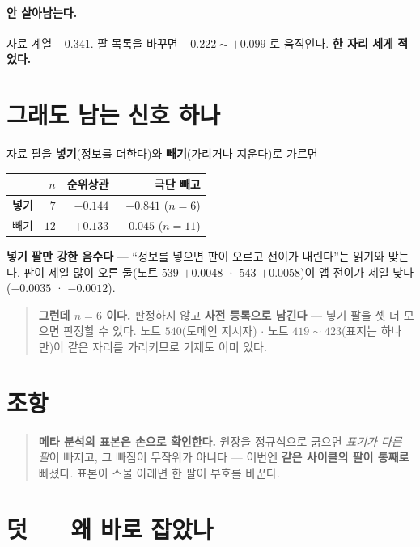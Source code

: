\documentclass[11pt]{article}
\begin{document}
\paragraph{안 살아남는다.}
자료 계열 $-0.341$. 팔 목록을 바꾸면 $-0.222 \sim +0.099$ 로 움직인다.
\textbf{한 자리 세게 적었다.}

\section{그래도 남는 신호 하나}

자료 팔을 \textbf{넣기}(정보를 더한다)와 \textbf{빼기}(가리거나 지운다)로
가르면

\begin{center}
\begin{tabular}{lrrr}
\hline
 & $n$ & 순위상관 & 극단 빼고 \\
\hline
\textbf{넣기} & $7$ & $-0.144$ & $\mathbf{-0.841}$ ($n=6$) \\
빼기 & $12$ & $+0.133$ & $-0.045$ ($n=11$) \\
\hline
\end{tabular}
\end{center}

\textbf{넣기 팔만 강한 음수다} --- ``정보를 넣으면 판이 오르고 전이가
내린다''는 읽기와 맞는다. 판이 제일 많이 오른 둘(노트 $539$ $+0.0048$ ·
$543$ $+0.0058$)이 앱 전이가 제일 낮다($-0.0035$ · $-0.0012$).

\begin{quote}
\textbf{그런데 $n=6$ 이다.} 판정하지 않고 \textbf{사전 등록으로 남긴다} ---
넣기 팔을 셋 더 모으면 판정할 수 있다. 노트 $540$(도메인 지시자) $\cdot$
노트 $419\!\sim\!423$(표지는 하나만)이 같은 자리를 가리키므로 기제도 이미
있다.
\end{quote}

\section*{조항}

\begin{quote}
\textbf{메타 분석의 표본은 손으로 확인한다.} 원장을 정규식으로 긁으면
\emph{표기가 다른 팔}이 빠지고, 그 빠짐이 무작위가 아니다 --- 이번엔
\textbf{같은 사이클의 팔이 통째로} 빠졌다. 표본이 스물 아래면 한 팔이
부호를 바꾼다.
\end{quote}

\section*{덧 --- 왜 바로 잡았나}
\end{document}
